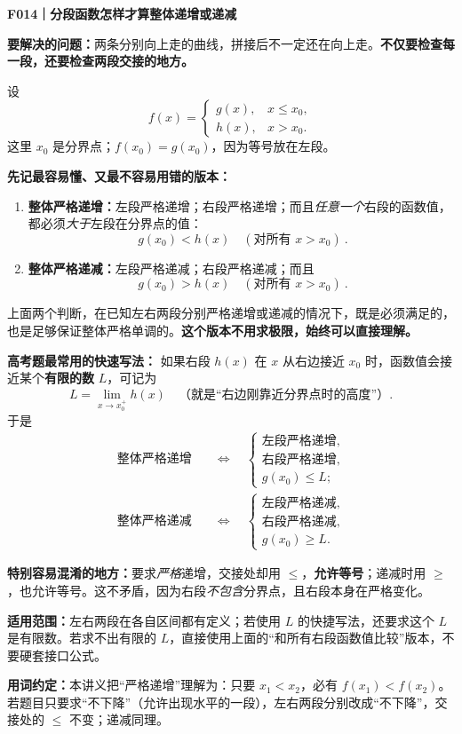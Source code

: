 \begin{statementbox}
\textbf{\textcolor{CStatement}{F014｜分段函数怎样才算整体递增或递减}}



\textbf{要解决的问题：}两条分别向上走的曲线，拼接后不一定还在向上走。\textbf{不仅要检查每一段，还要检查两段交接的地方。}

设
\[
 f(x)=\begin{cases}g(x),&x\le x_0,\\ h(x),&x>x_0.\end{cases}
\]
这里 $x_0$ 是分界点；$f(x_0)=g(x_0)$，因为等号放在左段。

\textbf{先记最容易懂、又最不容易用错的版本：}
\begin{enumerate}[leftmargin=*,itemsep=0.25em]
\item \textbf{整体严格递增：}左段严格递增；右段严格递增；而且\emph{任意一个}右段的函数值，都必须\emph{大于}左段在分界点的值：
\[
  \boxed{\ g(x_0)<h(x)\quad (\text{对所有 }x>x_0)\ }.
\]
\item \textbf{整体严格递减：}左段严格递减；右段严格递减；而且
\[
  \boxed{\ g(x_0)>h(x)\quad (\text{对所有 }x>x_0)\ }.
\]
\end{enumerate}
上面两个判断，在已知左右两段分别严格递增或递减的情况下，既是必须满足的，也是足够保证整体严格单调的。\textbf{这个版本不用求极限，始终可以直接理解。}

\medskip
\end{statementbox}
\clearpage
\begin{statementbox}
\textbf{高考题最常用的快速写法：}
如果右段 $h(x)$ 在 $x$ 从右边接近 $x_0$ 时，函数值会接近某个\textbf{有限的数} $L$，可记为
\[
 L=\lim_{x\to x_0^+}h(x)
 \quad\text{（就是“右边刚靠近分界点时的高度”）}.
\]
于是
\[
\boxed{\begin{aligned}
\text{整体严格递增}\quad&\Longleftrightarrow\quad
\begin{cases}\text{左段严格递增},\\\text{右段严格递增},\\g(x_0)\le L;\end{cases}\\[5pt]
\text{整体严格递减}\quad&\Longleftrightarrow\quad
\begin{cases}\text{左段严格递减},\\\text{右段严格递减},\\g(x_0)\ge L.\end{cases}
\end{aligned}}
\]

\textbf{特别容易混淆的地方：}要求\emph{严格}递增，交接处却用 $\le$，\textbf{允许等号}；递减时用 $\ge$，也允许等号。这不矛盾，因为右段\emph{不包含}分界点，且右段本身在严格变化。

\textbf{适用范围：}左右两段在各自区间都有定义；若使用 $L$ 的快捷写法，还要求这个 $L$ 是有限数。若求不出有限的 $L$，直接使用上面的“和所有右段函数值比较”版本，不要硬套接口公式。

\textbf{用词约定：}本讲义把“严格递增”理解为：只要 $x_1<x_2$，必有 $f(x_1)<f(x_2)$。若题目只要求“不下降”（允许出现水平的一段），左右两段分别改成“不下降”，交接处的 $\le$ 不变；递减同理。
\end{statementbox}
